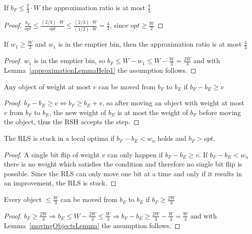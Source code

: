 \begin{lemma}\label{approximationLemmaHelp1}
    If \(b_F \le \frac{2}{3} \cdot W\) the approximation ratio is at most $\frac{4}{3}$
\end{lemma}
\begin{proof}
    \(\frac{b_F}{opt} \le \frac{(2/3) \cdot W}{opt} \le \frac{(2/3) \cdot W}{(1/2) \cdot W} = \frac{4}{3}\), since \(opt \ge \frac{W}{2}\)
\end{proof}

\begin{corollary}\label{approximationCorollaryHelp2}
    If \(w_1 \ge \frac{W}{3}\) and \(w_1\) is in the emptier bin, then the approximation ratio is at most $\frac{4}{3}$
\end{corollary}
\begin{proof}
    $w_1$ is in the emptier bin, so \( b_F \le W - w_1 \le W - \frac{W}{3} = \frac{2W}{3} \) and with Lemma~\ref{approximationLemmaHelp1} the assumption follows.
\end{proof}

\begin{lemma}\label{movingObjectsLemma}
    Any object of weight at most $v$ can be moved from $b_F$ to $b_E$ if \(b_F - b_E \ge v\)
\end{lemma}
\begin{proof}
    \(b_F - b_E \ge v \Leftrightarrow b_F \ge b_E + v\), so after moving an object with weight at most $v$ from $b_F$ to $b_E$, the new weight of $b_E$ is at most the weight of $b_F$ before moving the object, thus the RSH accepts the step.
\end{proof}

\begin{corollary}
    The RLS is stuck in a local optima if \(b_F-b_E < w_n\) holds and \(b_F > opt\).
\end{corollary}
\begin{proof}
    A single bit flip of weight $v$ can only happen if \(b_F - b_E \ge v\). If \(b_F-b_E < w_n\) there is no weight which satisfies the condition and therefore no single bit flip is possible. Since the RLS can only move one bit at a time and only if it results in an improvement, the RLS is stuck.
\end{proof}

\begin{corollary}\label{movingObjectsCorollary}
    Every object \(\le \frac{W}{3}\) can be moved from $b_F$ to $b_E$ if \(b_F \ge \frac{2W}{3}\)
\end{corollary}
\begin{proof}
    \(b_F \ge \frac{2W}{3} \Rightarrow b_E \le W - \frac{2W}{3} \le \frac{W}{3} \Rightarrow b_F - b_E \ge \frac{2W}{3} - \frac{W}{3} = \frac{W}{3}\) and with Lemma~\ref{movingObjectsLemma} the assumption follows.
\end{proof}

